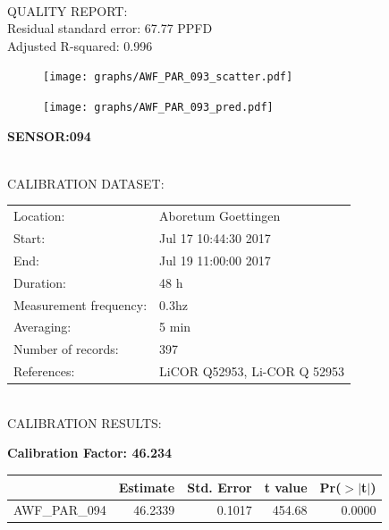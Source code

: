 \documentclass[oneside]{report}
\begin{document}
\hrulefill\\
QUALITY REPORT:\\
Residual standard error: 67.77 PPFD\\
Adjusted R-squared: 0.996



\begin{figure}[H]
  \centering
  \texttt{[image: graphs/AWF\_PAR\_093\_scatter.pdf]}
\end{figure}




\begin{figure}[H]
  \centering
  \texttt{[image: graphs/AWF\_PAR\_093\_pred.pdf]}
\end{figure}

\pagebreak


\begin{center}
\large{\textbf{SENSOR:094}}\\
\end{center}

\hrulefill\\
CALIBRATION DATASET:\\
\begin{table}[h!]
  \centering
  \label{tab:table1}
  \begin{tabular}{ll}
    Location: & Aboretum Goettingen\\ 
    
    
    Start:  & Jul 17 10:44:30 2017 \\
    End:   & Jul 19 11:00:00 2017\\ 
    Duration: & 48 h\\
    Measurement frequency: & 0.3hz\\
    Averaging:  &5 min\\
    Number of records: & 397 \\
    References: & LiCOR Q52953, Li-COR Q 52953 \\
  \end{tabular}
\end{table}

\hrulefill\\
CALIBRATION RESULTS:\\


\begin{center}
\textbf{\large{Calibration Factor: 46.234}}\\
\end{center}
\begin{table}[ht]
\centering
\begin{tabular}{rrrrr}
  \hline
 & Estimate & Std. Error & t value & Pr($>$$|$t$|$) \\ 
  \hline
AWF\_PAR\_094 & 46.2339 & 0.1017 & 454.68 & 0.0000 \\ 
   \hline
\end{tabular}
\end{table}
\end{document}
